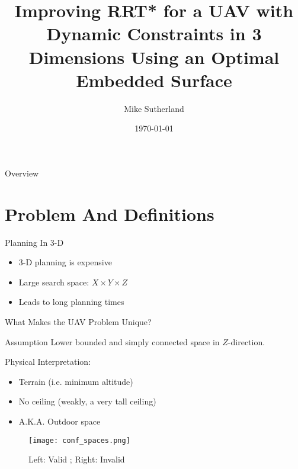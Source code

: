 \documentclass[xcolor=dvipsnames]{beamer}
\title[RRT* on an Embedded Optimal Surface]{Improving RRT* for a UAV with Dynamic Constraints in 3 Dimensions Using an Optimal Embedded Surface} %
\author[Mike Sutherland] {Mike Sutherland}
\institute[UCI] %
{
    Department of Mechanical and Aerospace Engineering \\
    University of California, Irvine %
}
\date{\today} %
\begin{document}
\begin{frame}
    \titlepage
\end{frame}

\begin{frame}{Overview}
    \tableofcontents
\end{frame}

\section{Problem And Definitions}

\begin{frame}{Planning In 3-D}
    \begin{itemize}
        \item 3-D planning is expensive
        \item Large search space: $X \times Y \times Z$
        \item Leads to long planning times
    \end{itemize}
\end{frame}

\begin{frame}{What Makes the UAV Problem Unique?}
    \begin{block}{Assumption}
        Lower bounded and simply connected space in $Z$-direction.
    \end{block}
    Physical Interpretation: 
    \begin{itemize}
        \item Terrain (i.e. minimum altitude)
        \item No ceiling (weakly, a very tall ceiling)
        \item A.K.A. Outdoor space
    \end{itemize}
    \begin{figure}
        \texttt{[image: conf\_spaces.png]}
        \caption{Left: Valid \cite{smithGlarusSwitzerland1781}; Right: Invalid \cite{proutInteriorCathedral1852}}
    \end{figure}
\end{frame}
\end{document}
